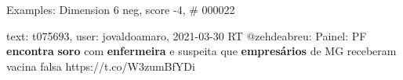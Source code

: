\begin{frame}{Examples: Dimension 6 neg, score -4, \# 000022}
\footnotesize
\begin{alertblock}{text: t075693, user: jovaldoamaro, 2021-03-30}
RT @zehdeabreu: Painel: PF \textbf{encontra} \textbf{soro} com 
\textbf{enfermeira} e suspeita que \textbf{empresários} de MG receberam vacina 
falsa https://t.co/W3zumBfYDi 
\end{alertblock}
\end{frame}
